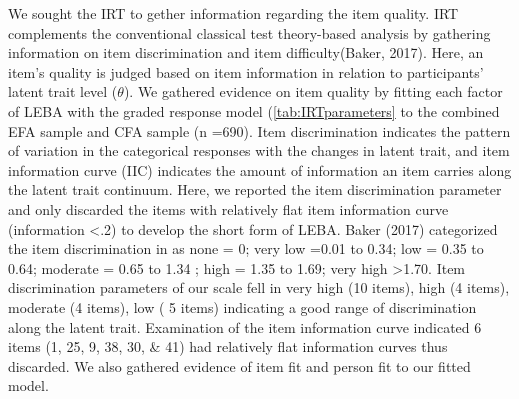 \documentclass[
  english,
  man]{apa6}
\begin{document}
We sought the IRT to gether information regarding the item quality. IRT complements the conventional classical test theory-based analysis by gathering information on item discrimination and item difficulty(Baker, 2017). Here, an item's quality is judged based on item information in relation to participants' latent trait level (\(\theta\)). We gathered evidence on item quality by fitting each factor of LEBA with the graded response model (\ref{tab:IRTparameters} to the combined EFA sample and CFA sample (n =690). Item discrimination indicates the pattern of variation in the categorical responses with the changes in latent trait, and item information curve (IIC) indicates the amount of information an item carries along the latent trait continuum. Here, we reported the item discrimination parameter and only discarded the items with relatively flat item information curve (information \textless.2) to develop the short form of LEBA. Baker (2017) categorized the item discrimination in as none = 0; very low =0.01 to 0.34; low = 0.35 to 0.64; moderate = 0.65 to 1.34 ; high = 1.35 to 1.69; very high \textgreater1.70. Item discrimination parameters of our scale fell in very high (10 items), high (4 items), moderate (4 items), low ( 5 items) indicating a good range of discrimination along the latent trait. Examination of the item information curve indicated 6 items (1, 25, 9, 38, 30, \& 41) had relatively flat information curves thus discarded. We also gathered evidence of item fit and person fit to our fitted model.
\end{document}
